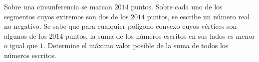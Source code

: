 Sobre una circunferencia se marcan $2014$ puntos. Sobre cada uno de los segmentos cuyos extremos son dos de los $2014$ puntos, se escribe un número real no negativo. Se sabe que para cualquier polígono convexo cuyos vértices son algunos de los $2014$ puntos, la suma de los números escritos en sus lados es menor o igual que $1$. Determine el máximo valor posible de la suma de todos los números escritos.
